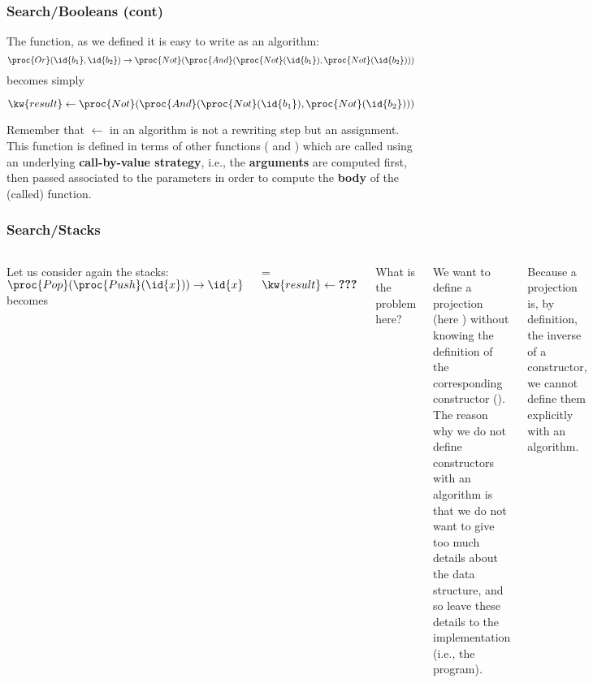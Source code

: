 %
\begin{frame}
\frametitle{Search/Booleans (cont)}

The  function, as we defined it is easy to write as an algorithm:
\[
\proc{Or} (\id{b_1}, \id{b_2}) \rightarrow \proc{Not} (\proc{And}
(\proc{Not} (\id{b_1}), \proc{Not} (\id{b_2})))
\]
becomes simply
\begin{codebox}
\zi	\(\kw{result} \gets \proc{Not} (\proc{And} (\proc{Not} (\id{b_1}),
\proc{Not} (\id{b_2})))\)
\end{codebox}
Remember that \(\gets\) in an algorithm is not a rewriting step but an
assignment. This function is defined in terms of other functions
( and ) which are called using an underlying
\textbf{call-by-value strategy}, i.e., the \textbf{arguments} are
computed first, then passed associated to the parameters in order to
compute the \textbf{body} of the (called) function.

\end{frame}

%
\begin{frame}
\frametitle{Search/Stacks}

\begin{columns}
    Let us consider again the stacks: \quad \(\proc{Pop} (\proc{Push}
    (\id{x})) \rightarrow \id{x}\) \quad becomes
    \begin{codebox}
      \zi	\If   {} = 
      \zi	\Then \Error
      \zi	\Else \(\kw{result} \gets \textbf{???}\)
      \zi	\End
    \end{codebox}
    What is the problem here? 

    \bigskip

    We want to define a projection (here ) without knowing
    the definition of the corresponding constructor ().
    The reason why we do not define constructors with an algorithm is
    that we do not want to give too much details about the data
    structure, and so leave these details to the implementation (i.e.,
    the program).

    \bigskip

    Because a projection is, by definition, the inverse of a
    constructor, we cannot define them explicitly with an algorithm.
\end{columns}

\end{frame}

